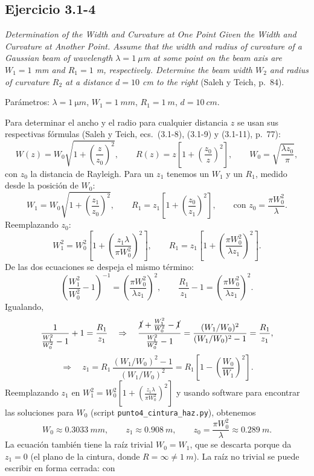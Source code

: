 \documentclass{article}
\begin{document}
\subsection{Ejercicio 3.1-4}

\emph{Determination of the Width and Curvature at One Point Given the Width and Curvature at Another
Point. Assume that the width and radius of curvature of a Gaussian beam of wavelength $\lambda=1\ \mu$m at
some point on the beam axis are $W_1=1$ mm and $R_1=1$ m, respectively. Determine the beam width $W_2$ and
radius of curvature $R_2$ at a distance $d=10$ cm to the right} (Saleh y Teich, p.~84).

\bigskip

Parámetros: $\lambda=\SI{1}{\micro m}$, $W_1=\SI{1}{mm}$, $R_1=\SI{1}{m}$, $d=\SI{10}{cm}$.

Para determinar el ancho y el radio para cualquier distancia $z$ se usan sus respectivas fórmulas
(Saleh y Teich, ecs.~(3.1-8), (3.1-9) y (3.1-11), p.~77):
\[
W(z)=W_0\sqrt{1+\left(\frac{z}{z_0}\right)^2},\qquad
R(z)=z\left[1+\left(\frac{z_0}{z}\right)^2\right],\qquad
W_0=\sqrt{\frac{\lambda z_0}{\pi}},
\]
con $z_0$ la distancia de Rayleigh. Para un $z_1$ tenemos un $W_1$ y un $R_1$, medido desde la posición
de $W_0$:
\[
W_1=W_0\sqrt{1+\left(\frac{z_1}{z_0}\right)^2},\qquad
R_1=z_1\left[1+\left(\frac{z_0}{z_1}\right)^2\right],\qquad\text{con }z_0=\frac{\pi W_0^2}{\lambda}.
\]
Reemplazando $z_0$:
\[
W_1^2=W_0^2\left[1+\left(\frac{z_1\lambda}{\pi W_0^2}\right)^2\right],\qquad
R_1=z_1\left[1+\left(\frac{\pi W_0^2}{\lambda z_1}\right)^2\right].
\]
De las dos ecuaciones se despeja el mismo término:
\[
\left(\frac{W_1^2}{W_0^2}-1\right)^{-1}=\left(\frac{\pi W_0^2}{\lambda z_1}\right)^2,\qquad
\frac{R_1}{z_1}-1=\left(\frac{\pi W_0^2}{\lambda z_1}\right)^2 .
\]
Igualando,
\[
\frac{1}{\frac{W_1^2}{W_0^2}-1}+1=\frac{R_1}{z_1}
\quad\Rightarrow\quad
\frac{\cancel{1}+\frac{W_1^2}{W_0^2}-\cancel{1}}{\frac{W_1^2}{W_0^2}-1}
=\frac{(W_1/W_0)^2}{(W_1/W_0)^2-1}=\frac{R_1}{z_1},
\]
\[
\Rightarrow\quad z_1=R_1\,\frac{(W_1/W_0)^2-1}{(W_1/W_0)^2}=R_1\left[1-\left(\frac{W_0}{W_1}\right)^2\right].
\]
Reemplazando $z_1$ en $W_1^2=W_0^2\left[1+\left(\frac{z_1\lambda}{\pi W_0^2}\right)^2\right]$ y usando
software para encontrar las soluciones para $W_0$ (script \texttt{punto4\_cintura\_haz.py}),
obtenemos
\[
W_0\approx\SI{0.3033}{mm},\qquad z_1\approx\SI{0.908}{m},\qquad z_0=\frac{\pi W_0^2}{\lambda}\approx\SI{0.289}{m}.
\]
La ecuación también tiene la raíz trivial $W_0=W_1$, que se descarta porque da $z_1=0$ (el plano de la
cintura, donde $R=\infty\neq\SI{1}{m}$). La raíz no trivial se puede escribir en forma cerrada: con
\end{document}
